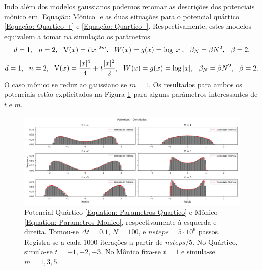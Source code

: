 Indo além dos modelos gaussianos podemos retomar as descrições dos potenciais mônico em \ref{Equação: Mônico} e as duas situações para o potencial quártico \ref{Equação: Quartico +} e \ref{Equação: Quartico -}. Respectivamente, estes modelos equivalem a tomar na simulação os parâmetros
\begin{equation}
	d = 1, \ \  n = 2, \ \ \V(x)= t |x|^{2m}, \ \ W(x) = g(x) = \log{|x|}, \ \ \beta_N = \beta N^2, \ \ \beta = 2.
	\label{Equation: Parametros Monico}
\end{equation}
\begin{equation}
	d = 1, \ \  n = 2, \ \ \V(x)=\frac{|x|^4}{4} + t \frac{|x|^2}{2}, \ \ W(x) = g(x) = \log{|x|}, \ \ \beta_N = \beta N^2, \ \ \beta = 2.
	\label{Equation: Parametros Quartico}
\end{equation}
O caso mônico se reduz ao gaussiano se $m=1$. Os resultados para ambos os potenciais estão explicitados na Figura \ref{Figura: Quartic Monic} para alguns parâmetros interessantes de $t$ e $m$.
\begin{figure}[ht!]
	\includegraphics[width=\textwidth]{Assets/validationQuarticMonic-alt.png}
	\caption{Potencial Quártico \ref{Equation: Parametros Quartico} e Mônico \ref{Equation: Parametros Monico}, respectivamente à esquerda e direita. Tomou-se $\Delta t = 0.1$, $N=100$, e $nsteps = 5\cdot10^6$ passos. Registra-se a cada $1000$ iterações a partir de $nsteps/5$. No Quártico, simula-se $t=-1,-2,-3$. No Mônico fixa-se $t=1$ e simula-se $m=1,3,5$.}
	\label{Figura: Quartic Monic}
\end{figure}

